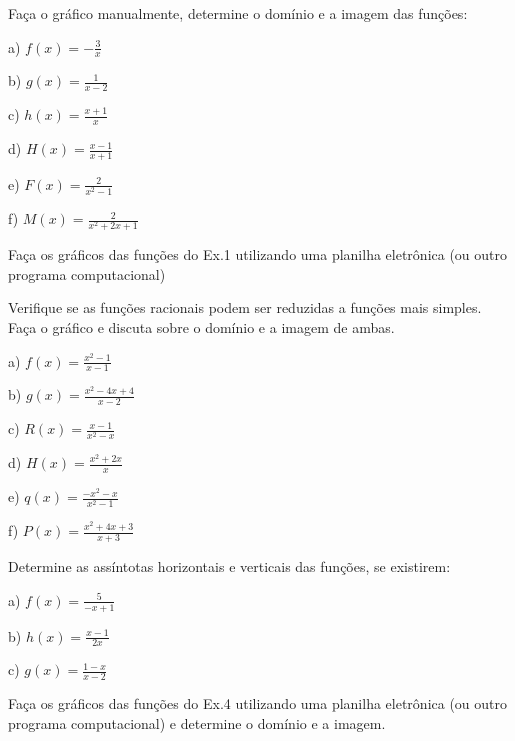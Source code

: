 \begin{exercicios}
	\exitem{} Faça o gráfico manualmente, determine o domínio e a imagem das funções:~ 

\begin{multicols}{3}

	a) \( f \left( x \right) =-\frac{3}{x} \)

	b) \( g \left( x \right) =\frac{1}{x-2} \)

	c)  \( h \left( x \right) =\frac{x+1}{x} \)

	d)  \( H \left( x \right) =\frac{x-1}{x+1} \)

	e)  \( F \left( x \right) =\frac{2}{x^{2}-1} \) 

	f)  \( M \left( x \right) =\frac{2}{x^{2}+2x+1} \) 
\end{multicols}

	\exitem{} Faça os gráficos das funções do Ex.1 utilizando uma planilha eletrônica (ou outro programa computacional) 

	\exitem{} Verifique se as funções racionais podem ser reduzidas a funções mais simples. Faça o gráfico e discuta sobre o domínio e a imagem de ambas.

\begin{multicols}{3}
	a) \( f \left( x \right) =\frac{x^{2}-1}{x-1} \)

	b) \( g \left( x \right) =\frac{x^{2}-4x+4}{x-2} \)
	
	c)  \( R \left( x \right) =\frac{x-1}{x^{2}-x} \)

	d)  \( H \left( x \right) =\frac{x^{2}+2x}{x} \)
	
	e) \( q \left( x \right) =\frac{-x^{2}-x}{x^{2}-1} \)

	f)  \( P \left( x \right) =\frac{x^{2}+4x+3}{x+3} \)
\end{multicols}

	\exitem{} Determine as assíntotas horizontais e verticais das funções, se existirem:
\begin{multicols}{3}
a)  \( f \left( x \right) =\frac{5}{-x+1} \)

b)  \( h \left( x \right) =\frac{x-1}{2x} \)

c)  \( g \left( x \right) =\frac{1-x}{x-2} \) 
\end{multicols}
	\exitem{} Faça os gráficos das funções do Ex.4 utilizando uma planilha eletrônica (ou outro programa computacional) e determine o domínio e a imagem.

\end{exercicios}


